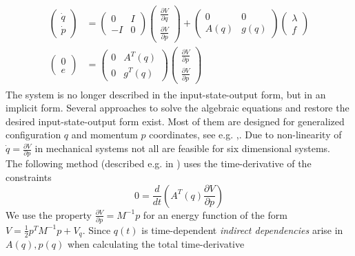 \documentclass[a4paper,twoside, openright,12pt]{report}
\begin{document}
\begin{eqnarray}\label{EQ:PHSpconstrained}
\begin{aligned}
\begin{pmatrix}
\dot{q} \\ \dot{p} \end{pmatrix} &= 
\begin{pmatrix} 0 & I \\ -I & 0\end{pmatrix}
\begin{pmatrix}
\frac{\partial V}{\partial q} \\ \frac{\partial V}{\partial p}\end{pmatrix}
+ \begin{pmatrix}0 & 0 \\ A(q) & g(q)\end{pmatrix}
\begin{pmatrix}\lambda \\ f\end{pmatrix}
\\
\begin{pmatrix}0 \\ e\end{pmatrix} &=
\begin{pmatrix}0 & A^T(q) \\ 0 & g^T(q)\end{pmatrix}
\begin{pmatrix}
\frac{\partial V}{\partial p} \\ \frac{\partial V}{\partial p}\end{pmatrix}
\end{aligned}
\end{eqnarray}
The system is no longer described in the input-state-output form, but in an implicit form. Several approaches to solve the algebraic equations and restore the desired input-state-output form exist. Most of them are designed for generalized configuration $q$ and momentum $p$ coordinates, see e.g. \cite{Schaft_13},\cite{Duindam_09}. Due to non-linearity of $\dot{q}=\frac{\partial V}{\partial p}$ in mechanical systems not all are feasible for six dimensional systems. \\
The following method (described e.g. in \cite{Duindam_09}) uses the time-derivative of the constraints
\begin{equation}\label{EQ:constraintderivative}
0 = \frac{d}{dt}\left(A^T(q)\frac{\partial V}{\partial p}\right)
\end{equation}
We use the property $\frac{\partial V}{\partial p}=M^{-1}p$ for an energy function of the form $V = \frac{1}{2}p^TM^{-1}p + V_q$. Since $q(t)$ is time-dependent \emph{indirect dependencies} arise in $A(q),p(q)$ when calculating the total time-derivative
\end{document}
